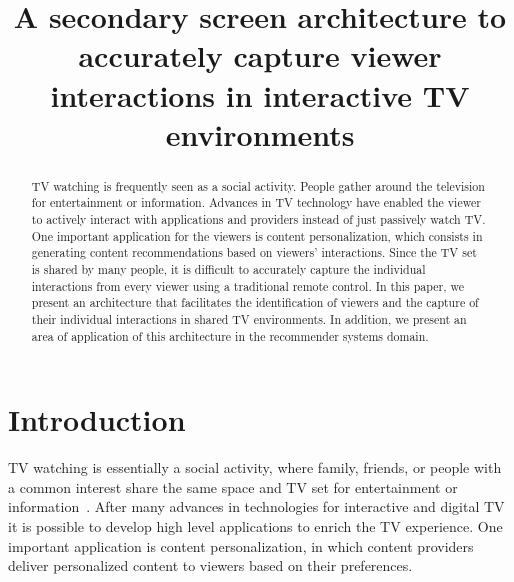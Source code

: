 \documentclass[conference,a4paper]{IEEEtran}
\begin{document}
\title{A secondary screen architecture to accurately capture viewer interactions in interactive TV environments}

\author{
\and
{}
}
\maketitle

\begin{abstract}
TV watching is frequently seen as a social activity. People gather around the television for entertainment or information. Advances in TV technology have enabled the viewer to actively interact with applications and providers instead of just passively watch TV. One important application for the viewers is content personalization, which consists in generating content recommendations based on viewers' interactions. Since the TV set is shared by many people, it is difficult to accurately capture the individual interactions from every viewer using a traditional remote control. In this paper, we present an architecture that facilitates the identification of viewers and the capture of their individual interactions in shared TV environments. In addition, we present an area of application of this architecture in the recommender systems domain.
\end{abstract}

\IEEEpeerreviewmaketitle

\section{Introduction}

TV watching is essentially a social activity, where family, friends, or people with a common interest share the same space and TV set for entertainment or information~\cite{Masthoff2004}. After many advances in technologies for interactive and digital TV it is possible to develop high level applications to enrich the TV experience. One important application is content personalization, in which content providers deliver personalized content to viewers based on their preferences.
\end{document}
